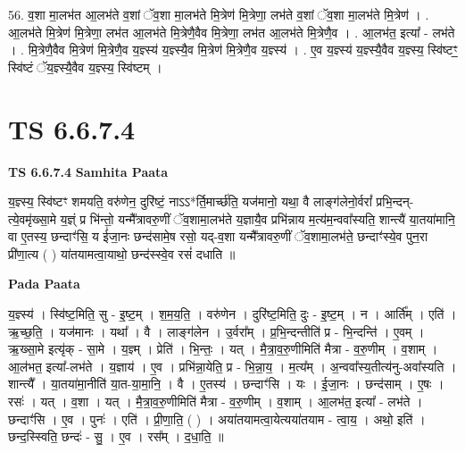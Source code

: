 \documentclass[17pt]{extarticle}
\begin{document}
56. व॒शा मा॒लभ॑त आ॒लभ॑ते व॒शां ॅव॒शा मा॒लभ॑ते मि॒त्रेण॑ मि॒त्रेणा॒ लभ॑ते व॒शां ॅव॒शा मा॒लभ॑ते मि॒त्रेण॑ । . आ॒लभ॑ते मि॒त्रेण॑ मि॒त्रेणा॒ लभ॑त आ॒लभ॑ते मि॒त्रेणै॒वैव मि॒त्रेणा॒ लभ॑त आ॒लभ॑ते मि॒त्रेणै॒व । . आ॒लभ॑त॒ इत्या᳚ - लभ॑ते । . मि॒त्रेणै॒वैव मि॒त्रेण॑ मि॒त्रेणै॒व य॒ज्ञ्स्य॑ य॒ज्ञ्स्यै॒व मि॒त्रेण॑ मि॒त्रेणै॒व य॒ज्ञ्स्य॑ । . ए॒व य॒ज्ञ्स्य॑ य॒ज्ञ्स्यै॒वैव य॒ज्ञ्स्य॒ स्वि॑ष्टꣳ॒॒ स्वि॑ष्टं ॅय॒ज्ञ्स्यै॒वैव य॒ज्ञ्स्य॒ स्वि॑ष्टम् । \newline
\pagebreak
{}

\section{ TS 6.6.7.4 }

\textbf{TS 6.6.7.4 } \newline
\textbf{Samhita Paata} \newline

य॒ज्ञ्स्य॒ स्वि॑ष्टꣳ शमयति॒ वरु॑णेन॒ दुरि॑ष्टं॒ नाऽऽ*र्ति॒मार्च्छ॑ति॒ यज॑मानो॒ यथा॒ वै लाङ्ग॑लेनो॒र्वरां᳚ प्रभि॒न्दन्-त्ये॒वमृ॑ख्सा॒मे य॒ज्ञ्ं प्र भि॑न्तो॒ यन्मै᳚त्रावरु॒णीं ॅव॒शामा॒लभ॑ते य॒ज्ञायै॒व प्रभि॑न्नाय म॒त्य॑म॒न्ववा᳚स्यति॒ शान्त्यै॑ या॒तया॑मानि॒ वा ए॒तस्य॒ छन्दाꣳ॑सि॒ य ई॑जा॒नः छन्द॑सामे॒ष रसो॒ यद्-व॒शा यन्मै᳚त्रावरु॒णीं ॅव॒शामा॒लभ॑ते॒ छन्दाꣳ॑स्ये॒व पुन॒रा प्री॑णा॒त्य ( ) या॑तयामत्वा॒याथो॒ छन्द॑स्स्वे॒व रसं॑ दधाति ॥ \newline

\textbf{Pada Paata} \newline

य॒ज्ञ्स्य॑ । स्वि॑ष्ट॒मिति॒ सु - इ॒ष्ट॒म् । श॒म॒य॒ति॒ । वरु॑णेन । दुरि॑ष्ट॒मिति॒ दुः - इ॒ष्ट॒म् । न । आर्ति᳚म् । एति॑ । ऋ॒च्छ॒ति॒ । यज॑मानः । यथा᳚ । वै । लाङ्ग॑लेन । उ॒र्वरा᳚म् । प्र॒भि॒न्दन्तीति॑ प्र - भि॒न्दन्ति॑ । ए॒वम् । ऋ॒ख्सा॒मे इत्यृ॑क् - सा॒मे । य॒ज्ञ्म् । प्रेति॑ । भि॒न्तः॒ । यत् । मै॒त्रा॒व॒रु॒णीमिति॑ मैत्रा - व॒रु॒णीम् । व॒शाम् । आ॒ल॑भत॒ इत्या᳚-लभ॑ते । य॒ज्ञाय॑ । ए॒व । प्रभि॑न्ना॒येति॒ प्र - भि॒न्ना॒य॒ । म॒त्य᳚म् । अ॒न्ववा᳚स्य॒तीत्य॑नु-अवा᳚स्यति । शान्त्यै᳚ । या॒तया॑मा॒नीति॑ या॒त-या॒मा॒नि॒ । वै । ए॒तस्य॑ । छन्दाꣳ॑सि । यः । ई॒जा॒नः । छन्द॑साम् । ए॒षः । रसः॑ । यत् । व॒शा । यत् । मै॒त्रा॒व॒रु॒णीमिति॑ मैत्रा - व॒रु॒णीम् । व॒शाम् । आ॒लभ॑त॒ इत्या᳚ - लभ॑ते । छन्दाꣳ॑सि । ए॒व । पुनः॑ । एति॑ । प्री॒णा॒ति॒ ( ) । अया॑तयामत्वा॒येत्यया॑तयाम - त्वा॒य॒ । अथो॒ इति॑ । छन्द॒स्स्विति॒ छन्दः॑ - सु॒ । ए॒व । रस᳚म् । द॒धा॒ति॒ ॥  \newline
\end{document}
